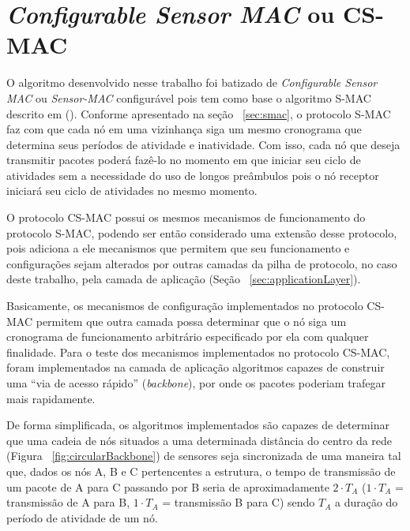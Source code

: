 \section{\emph{Configurable Sensor MAC} ou CS-MAC}

O algoritmo desenvolvido nesse trabalho foi batizado de \emph{Configurable Sensor MAC} ou \emph{Sensor-MAC} configurável pois tem como base o algoritmo S-MAC descrito em  (\citeyear{ye04}). Conforme apresentado na seção ~\ref{sec:smac}, o protocolo S-MAC faz com que cada nó em uma vizinhança siga um mesmo cronograma que determina seus períodos de atividade e inatividade. Com isso, cada nó que deseja transmitir pacotes poderá fazê-lo no momento em que iniciar seu ciclo de atividades sem a necessidade do uso de longos preâmbulos pois o nó receptor iniciará seu ciclo de atividades no mesmo momento.

O protocolo CS-MAC possui os mesmos mecanismos de funcionamento do protocolo S-MAC, podendo ser então considerado uma extensão desse protocolo, pois adiciona a ele mecanismos que permitem que seu funcionamento e configurações sejam alterados por outras camadas da pilha de protocolo, no caso deste trabalho, pela camada de aplicação (Seção ~\ref{sec:applicationLayer}). 

Basicamente, os mecanismos de configuração implementados no protocolo CS-MAC permitem que outra camada possa determinar que o nó siga um cronograma de funcionamento arbitrário especificado por ela com qualquer finalidade. Para o teste dos mecanismos implementados no protocolo CS-MAC, foram implementados na camada de aplicação algoritmos capazes de construir uma ``via de acesso rápido'' (\emph{backbone}), por onde os pacotes poderiam trafegar mais rapidamente.

De forma simplificada, os algoritmos implementados são capazes de determinar que uma cadeia de nós situados a uma determinada distância do centro da rede (Figura ~\ref{fig:circularBackbone}) de sensores seja sincronizada de uma maneira tal que, dados os nós A, B e C pertencentes a estrutura, o tempo de transmissão de um pacote de A para C passando por B seria de aproximadamente $2 \cdot T_A$  ($1 \cdot T_A$ = transmissão de A para B, $1 \cdot T_A$ = transmissão B para C) sendo $T_A$ a duração do período de atividade de um nó. 

